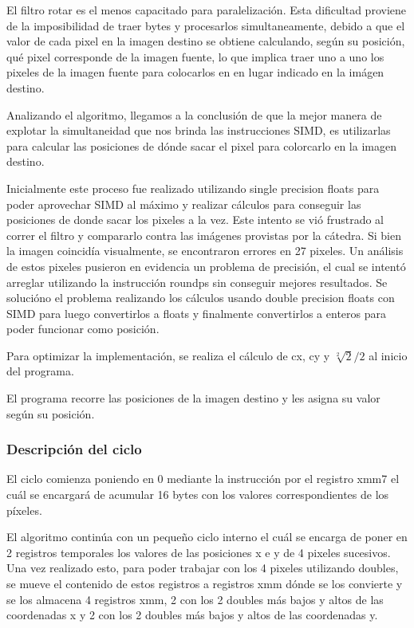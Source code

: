 El filtro rotar es el menos capacitado para paralelización. Esta dificultad proviene de la imposibilidad de traer bytes y procesarlos simultaneamente, debido a que el valor de cada pixel en la imagen destino se obtiene calculando, según su posición, qué pixel corresponde de la imagen fuente, lo que implica traer uno a uno los pixeles de la imagen fuente para colocarlos en en lugar indicado en la imágen destino.

Analizando el algoritmo, llegamos a la conclusión de que la mejor manera de explotar la simultaneidad que nos brinda las instrucciones SIMD, es utilizarlas para calcular las posiciones de dónde sacar el pixel para colorcarlo en la imagen destino. 

Inicialmente este proceso fue realizado utilizando single precision floats para poder aprovechar SIMD al máximo y realizar cálculos para conseguir las posiciones de donde sacar los pixeles a la vez. Este intento se vió frustrado al correr el filtro y compararlo contra las imágenes provistas por la cátedra. Si bien la imagen coincidía visualmente, se encontraron errores en 27 pixeles. Un análisis de estos pixeles pusieron en evidencia un problema de precisión, el cual se intentó arreglar utilizando la instrucción roundps sin conseguir mejores resultados. Se solucióno el problema realizando los cálculos usando double precision floats con SIMD para luego convertirlos a floats y finalmente convertirlos a enteros para poder funcionar como posición.

Para optimizar la implementación, se realiza el cálculo de cx, cy y $\sqrt[2]{2}/2$ al inicio del programa.

El programa recorre las posiciones de la imagen destino y les asigna su valor según su posición.

\subsubsection{Descripción del ciclo}
El ciclo comienza poniendo en 0 mediante la instrucción por el registro xmm7 el cuál se encargará de acumular 16 bytes con los valores correspondientes de los píxeles.

 El algoritmo continúa con un pequeño ciclo interno el cuál se encarga de poner en 2 registros temporales los valores de las posiciones x e y de 4 pixeles sucesivos. Una vez realizado esto, para poder trabajar con los 4 pixeles utilizando doubles, se mueve el contenido de estos registros a registros xmm dónde se los convierte y se los almacena 4 registros xmm, 2 con los 2 doubles más bajos y altos de las coordenadas x y 2 con los 2 doubles más bajos y altos de las coordenadas y.

